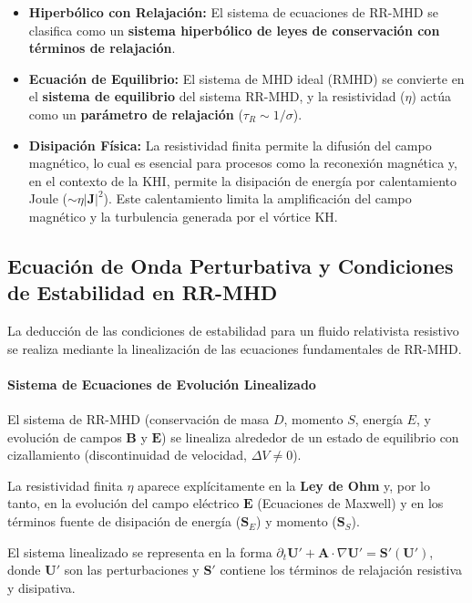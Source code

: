 \begin{itemize}
    \item \textbf{Hiperbólico con Relajación:} El sistema de ecuaciones de RR-MHD se clasifica como un \textbf{sistema hiperbólico de leyes de conservación con términos de relajación}.
    \item \textbf{Ecuación de Equilibrio:} El sistema de MHD ideal (RMHD) se convierte en el \textbf{sistema de equilibrio} del sistema RR-MHD, y la resistividad ($\eta$) actúa como un \textbf{parámetro de relajación} ($\tau_R \sim 1/\sigma$).
    \item \textbf{Disipación Física:} La resistividad finita permite la difusión del campo magnético, lo cual es esencial para procesos como la reconexión magnética y, en el contexto de la KHI, permite la disipación de energía por calentamiento Joule ($\sim \eta |\mathbf{J}|^2$). Este calentamiento limita la amplificación del campo magnético y la turbulencia generada por el vórtice KH.
\end{itemize}

\subsection{Ecuación de Onda Perturbativa y Condiciones de Estabilidad en RR-MHD}

La deducción de las condiciones de estabilidad para un fluido relativista resistivo se realiza mediante la linealización de las ecuaciones fundamentales de RR-MHD.

\paragraph{Sistema de Ecuaciones de Evolución Linealizado}
El sistema de RR-MHD (conservación de masa $D$, momento $S$, energía $E$, y evolución de campos $\mathbf{B}$ y $\mathbf{E}$) se linealiza alrededor de un estado de equilibrio con cizallamiento (discontinuidad de velocidad, $\Delta V \ne 0$).

La resistividad finita $\eta$ aparece explícitamente en la \textbf{Ley de Ohm} y, por lo tanto, en la evolución del campo eléctrico $\mathbf{E}$ (Ecuaciones de Maxwell) y en los términos fuente de disipación de energía ($\mathbf{S}_E$) y momento ($\mathbf{S}_S$).

El sistema linealizado se representa en la forma $\partial_t \mathbf{U}' + \mathbf{A} \cdot \nabla \mathbf{U}' = \mathbf{S}'(\mathbf{U}')$, donde $\mathbf{U}'$ son las perturbaciones y $\mathbf{S}'$ contiene los términos de relajación resistiva y disipativa.

